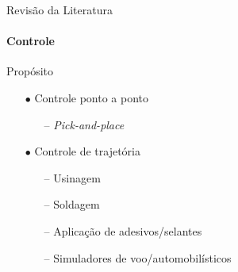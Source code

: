 \documentclass[25pt,landscape]{beamer}
\begin{document}
\begin{frame}{Revisão da Literatura}
    \framesubtitle{Controle}
        \begin{block}{Propósito}
    	\begin{itemize}
    		\item[$\bullet$] Controle ponto a ponto
    		\begin{itemize}
    			\item[--] \emph{Pick-and-place} \\[6pt]
    		\end{itemize}
    		\item[$\bullet$] Controle de trajetória
    		\begin{itemize}
    			\item[--] Usinagem \\[6pt]
    			\item[--] Soldagem \\[6pt]
    			\item[--] Aplicação de adesivos/selantes \\[6pt]
    			\item[--] Simuladores de voo/automobilísticos \\[6pt]
    		\end{itemize}
    	\end{itemize}
    \end{block}
\end{frame}
\end{document}
